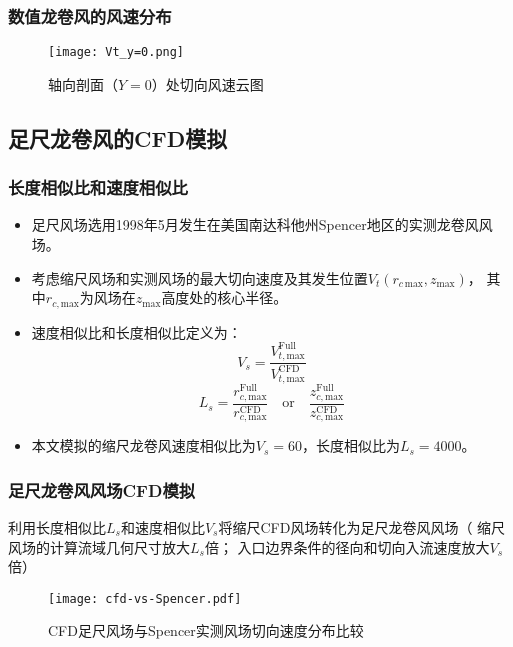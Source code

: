 \begin{frame}
  \frametitle{数值龙卷风的风速分布}

  \begin{figure}[!htbp]
    \centering
    \texttt{[image: Vt\_y=0.png]}
    \caption*{轴向剖面（$Y=0$）处切向风速云图}
    \label{fig:Vt-x=0}
  \end{figure}


\end{frame}

\subsection{足尺龙卷风的CFD模拟}

\begin{frame}
  \frametitle{长度相似比和速度相似比}
  \begin{itemize}
  \item
    足尺风场选用1998年5月发生在美国南达科他州Spencer地区的实测龙卷风风场。 
  \item
    考虑缩尺风场和实测风场的最大切向速度及其发生位置$V_t(r_{c\,\mathrm{max}}, z_{\mathrm{max}})$，
    其中$r_{c,\mathrm{max}}$为风场在$z_{\mathrm{max}}$高度处的核心半径。
  \item
    速度相似比和长度相似比定义为：
    \begin{equation}
      V_s  =  \frac{V_{t,\mathrm{max}}^{\text{Full}}}{V_{t,\mathrm{max}}^{\text{CFD}}}
    \end{equation}
    \begin{equation}
      L_s  =  \frac{r_{c,\mathrm{max}}^{\text{Full}}}{r_{c,\mathrm{max}}^{\text{CFD}}} \quad \text{or} \quad \frac{z_{c,\mathrm{max}}^{\text{Full}}}{z_{c,\mathrm{max}}^{\text{CFD}}}
    \end{equation}  
  \item
    本文模拟的缩尺龙卷风速度相似比为$V_s=60$，长度相似比为$L_s=4000$。
  \end{itemize}
  
\end{frame}

\begin{frame}
  \frametitle{足尺龙卷风风场CFD模拟}
  利用长度相似比$L_s$和速度相似比$V_s$将缩尺CFD风场转化为足尺龙卷风风场（
  缩尺风场的计算流域几何尺寸放大$L_s$倍；
  入口边界条件的径向和切向入流速度放大$V_s$倍）
  \begin{figure}[!htbp]
    \centering
    \texttt{[image: cfd-vs-Spencer.pdf]}
    \caption*{CFD足尺风场与Spencer实测风场切向速度分布比较}
    \label{fig:cfd-Spencer}
  \end{figure}

\end{frame}

